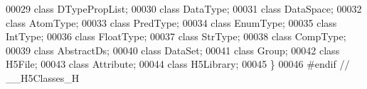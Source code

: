 \begin{DoxyCode}
00029         \textcolor{keyword}{class }DTypePropList;
00030         \textcolor{keyword}{class }DataType;
00031         \textcolor{keyword}{class }DataSpace;
00032         \textcolor{keyword}{class }AtomType;
00033         \textcolor{keyword}{class }PredType;
00034         \textcolor{keyword}{class }EnumType;
00035         \textcolor{keyword}{class }IntType;
00036         \textcolor{keyword}{class }FloatType;
00037         \textcolor{keyword}{class }StrType;
00038         \textcolor{keyword}{class }CompType;
00039         \textcolor{keyword}{class }AbstractDs;
00040         \textcolor{keyword}{class }DataSet;
00041         \textcolor{keyword}{class }Group;
00042         \textcolor{keyword}{class }H5File;
00043         \textcolor{keyword}{class }Attribute;
00044         \textcolor{keyword}{class }H5Library;
00045 \}
00046 \textcolor{preprocessor}{#endif // \_\_H5Classes\_H}
\end{DoxyCode}
